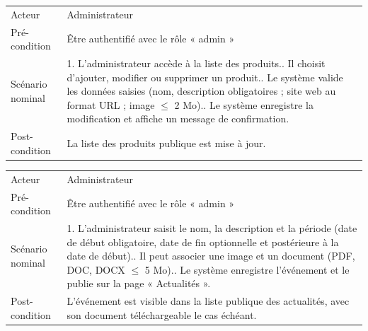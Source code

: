 \documentclass[11pt,a4paper]{report}
\begin{document}
\begin{center}
\renewcommand{\arraystretch}{1.3}
\begin{longtable}{L{3.3cm} L{9.2cm}}
\toprule
{}
 \\
\midrule
\endhead
Acteur & Administrateur \\
Pré-condition & Être authentifié avec le rôle « admin » \\
Scénario nominal &
1. L'administrateur accède à la liste des produits.. Il choisit d'ajouter, modifier ou supprimer un produit.. Le système valide les données saisies (nom, description obligatoires ;
site web au format URL ; image $\leq$ 2 Mo).. Le système enregistre la modification et affiche un message de
confirmation. \\
Post-condition & La liste des produits publique est mise à jour. \\
\bottomrule
\end{longtable}

\begin{longtable}{L{3.3cm} L{9.2cm}}
\toprule
{}
 \\
\midrule
\endhead
Acteur & Administrateur \\
Pré-condition & Être authentifié avec le rôle « admin » \\
Scénario nominal &
1. L'administrateur saisit le nom, la description et la période (date de
début obligatoire, date de fin optionnelle et postérieure à la date de
début).. Il peut associer une image et un document (PDF, DOC, DOCX $\leq$ 5 Mo).. Le système enregistre l'événement et le publie sur la page « Actualités ». \\
Post-condition & L'événement est visible dans la liste publique des
actualités, avec son document téléchargeable le cas échéant. \\
\bottomrule
\end{longtable}


\end{center}
\end{document}
